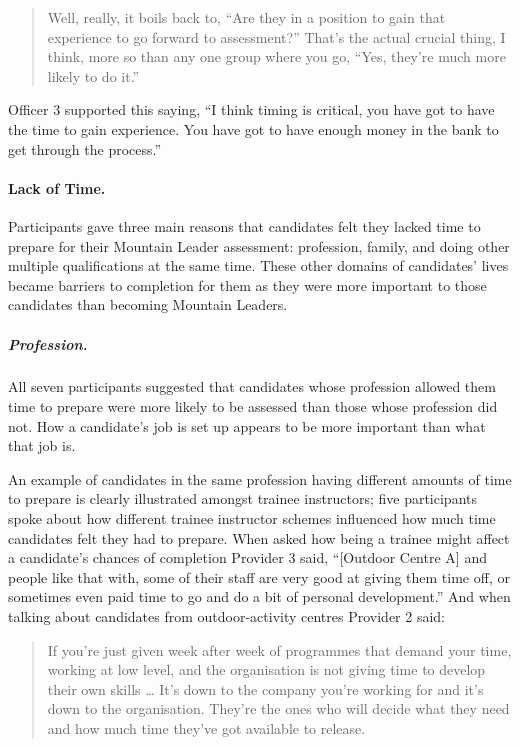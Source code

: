 \documentclass[
  12pt,
  a4paper,
]{book}
\begin{document}
\begin{quote}
Well, really, it boils back to, ``Are they in a position to gain that experience to go forward to assessment?'' That's the actual crucial thing, I think, more so than any one group where you go, ``Yes, they're much more likely to do it.''
\end{quote}

Officer 3 supported this saying, ``I think timing is critical, you have got to have the time to gain experience. You have got to have enough money in the bank to get through the process.''

\hypertarget{qual-gta-lack-of-time}{%
\paragraph{Lack of Time.}\label{qual-gta-lack-of-time}}

Participants gave three main reasons that candidates felt they lacked time to prepare for their Mountain Leader assessment: profession, family, and doing other multiple qualifications at the same time. These other domains of candidates' lives became barriers to completion for them as they were more important to those candidates than becoming Mountain Leaders.

\hypertarget{profession.}{%
\subparagraph{Profession.}\label{profession.}}

All seven participants suggested that candidates whose profession allowed them time to prepare were more likely to be assessed than those whose profession did not. How a candidate's job is set up appears to be more important than what that job is.

An example of candidates in the same profession having different amounts of time to prepare is clearly illustrated amongst trainee instructors; five participants spoke about how different trainee instructor schemes influenced how much time candidates felt they had to prepare. When asked how being a trainee might affect a candidate's chances of completion Provider 3 said, ``{[}Outdoor Centre A{]} and people like that with, some of their staff are very good at giving them time off, or sometimes even paid time to go and do a bit of personal development.'' And when talking about candidates from outdoor-activity centres Provider 2 said:

\begin{quote}
If you're just given week after week of programmes that demand your time, working at low level, and the organisation is not giving time to develop their own skills \ldots{} It's down to the company you're working for and it's down to the organisation. They're the ones who will decide what they need and how much time they've got available to release.
\end{quote}
\end{document}
